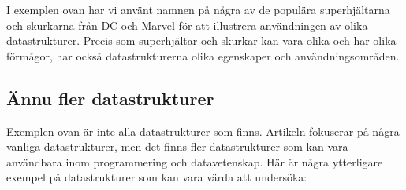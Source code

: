 \hypertarget{cb6}{}
\begin{Shaded}
\begin{Highlighting}[]
 \OperatorTok{;}
 \OperatorTok{\{}
   \OperatorTok{(}\OperatorTok{[]}\OperatorTok{)} \OperatorTok{\{}
\OperatorTok{\textless{}}\OperatorTok{\textgreater{}}\OperatorTok{=}  \OperatorTok{\textless{}}\OperatorTok{\textgreater{}();}
\OperatorTok{(}\OperatorTok{);}
\OperatorTok{(}\OperatorTok{);}
\OperatorTok{(}\OperatorTok{);}
\OperatorTok{(}\OperatorTok{());}  
\OperatorTok{\}}
\OperatorTok{\}}
\end{Highlighting}
\end{Shaded}

I exemplen ovan har vi använt namnen på några av de populära
superhjältarna och skurkarna från DC och Marvel för att illustrera
användningen av olika datastrukturer. Precis som superhjältar och
skurkar kan vara olika och har olika förmågor, har också
datastrukturerna olika egenskaper och användningsområden.

\hypertarget{uxe4nnu-fler-datastrukturer}{%
\subsection{Ännu fler
datastrukturer}\label{uxe4nnu-fler-datastrukturer}}

Exemplen ovan är inte alla datastrukturer som finns. Artikeln fokuserar
på några vanliga datastrukturer, men det finns fler datastrukturer som
kan vara användbara inom programmering och datavetenskap. Här är några
ytterligare exempel på datastrukturer som kan vara värda att undersöka:

